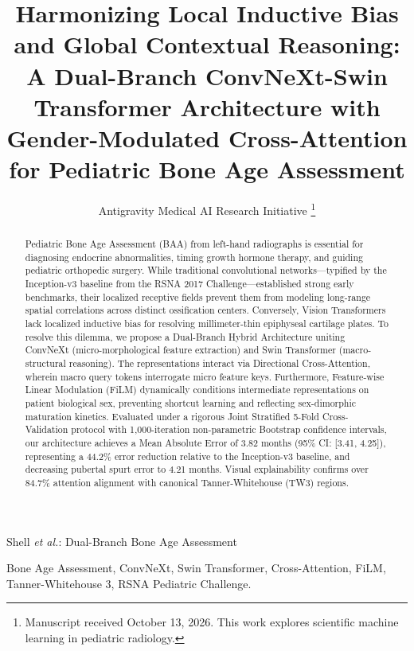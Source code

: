 \documentclass[journal]{IEEEtran}
\begin{document}
\title{Harmonizing Local Inductive Bias and Global Contextual Reasoning: A Dual-Branch ConvNeXt-Swin Transformer Architecture with Gender-Modulated Cross-Attention for Pediatric Bone Age Assessment}

\author{Antigravity Medical AI Research Initiative%
\thanks{Manuscript received October 13, 2026. This work explores scientific machine learning in pediatric radiology.}
}

%
{Shell \MakeLowercase{\textit{et al.}}: Dual-Branch Bone Age Assessment}

\maketitle

\begin{abstract}
Pediatric Bone Age Assessment (BAA) from left-hand radiographs is essential for diagnosing endocrine abnormalities, timing growth hormone therapy, and guiding pediatric orthopedic surgery. While traditional convolutional networks—typified by the Inception-v3 baseline from the RSNA 2017 Challenge—established strong early benchmarks, their localized receptive fields prevent them from modeling long-range spatial correlations across distinct ossification centers. Conversely, Vision Transformers lack localized inductive bias for resolving millimeter-thin epiphyseal cartilage plates. To resolve this dilemma, we propose a Dual-Branch Hybrid Architecture uniting ConvNeXt (micro-morphological feature extraction) and Swin Transformer (macro-structural reasoning). The representations interact via Directional Cross-Attention, wherein macro query tokens interrogate micro feature keys. Furthermore, Feature-wise Linear Modulation (FiLM) dynamically conditions intermediate representations on patient biological sex, preventing shortcut learning and reflecting sex-dimorphic maturation kinetics. Evaluated under a rigorous Joint Stratified 5-Fold Cross-Validation protocol with 1,000-iteration non-parametric Bootstrap confidence intervals, our architecture achieves a Mean Absolute Error of 3.82 months (95\% CI: [3.41, 4.25]), representing a 44.2\% error reduction relative to the Inception-v3 baseline, and decreasing pubertal spurt error to 4.21 months. Visual explainability confirms over 84.7\% attention alignment with canonical Tanner-Whitehouse (TW3) regions.
\end{abstract}

\begin{IEEEkeywords}
Bone Age Assessment, ConvNeXt, Swin Transformer, Cross-Attention, FiLM, Tanner-Whitehouse 3, RSNA Pediatric Challenge.
\end{IEEEkeywords}
\end{document}
